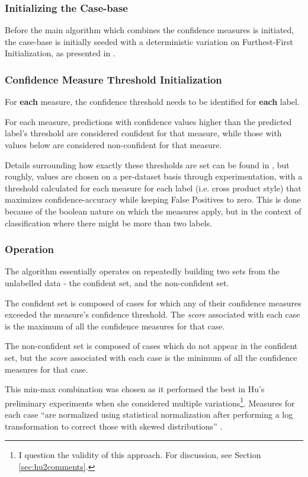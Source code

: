 \documentclass[a4paper,11pt]{report}
\begin{document}
\subsubsection{Initializing the Case-base}
Before the main algorithm which combines the confidence measures is initiated, the case-base is initially seeded with a deterministic variation on Furthest-First Initialization, as presented in \citet{Greene2007}.

\subsubsection{Confidence Measure Threshold Initialization}
For \textbf{each} measure, the confidence threshold needs to be identified for \textbf{each} label.

For each measure, predictions with confidence values higher than the predicted label's threshold are considered confident for that measure, while those with values below are considered non-confident for that measure.

Details surrounding how exactly these thresholds are set can be found in \citet{Delany2005}, but roughly, values are chosen on a per-dataset basis through experimentation, with a threshold calculated for each measure for each label (i.e. cross product style) that maximizes confidence-accuracy while keeping False Positives to zero. This is done because of the boolean nature on which the measures apply, but in the context of classification where there might be more than two labels. 

\subsubsection{Operation}
The algorithm essentially operates on repeatedly building two sets from the unlabelled data - the confident set, and the non-confident set.

The confident set is composed of cases for which any of their confidence measures exceeded the measure's confidence threshold. The \emph{score} associated with each case is the maximum of all the confidence measures for that case.

The non-confident set is composed of cases which do not appear in the confident set, but the \emph{score} associated with each case is the minimum of all the confidence measures for that case. 

This min-max combination was chosen as it performed the best in Hu's preliminary experiments when she considered multiple variations\footnote{I question the validity of this approach. For discussion, see Section \ref{sec:hu2comments}.}. Measures for each case ``are normalized using statistical normalization after performing a log transformation to correct those with skewed distributions'' \citep{Hu2011}.
\end{document}

